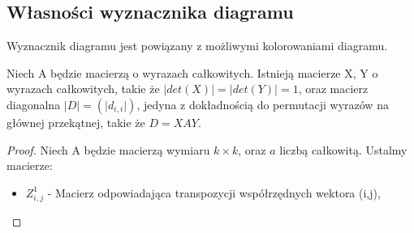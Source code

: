 \subsection{Własności wyznacznika diagramu}
Wyznacznik diagramu jest powiązany z możliwymi kolorowaniami diagramu.

\begin{lemat}
Niech A będzie macierzą o wyrazach całkowitych. Istnieją macierze X, Y o wyrazach całkowitych, takie że $\vert det(X) \vert= \vert det(Y) \vert=1$, oraz macierz diagonalna $\vert D \vert=(\vert d_{i,i} \vert)$, jedyna z dokładnością do permutacji wyrazów na głównej przekątnej, takie że $D=XAY$.
\end{lemat}
\begin{proof}
Niech A będzie macierzą wymiaru $k \times k$, oraz  $a$ liczbą całkowitą. Ustalmy macierze:
\begin{itemize}
\item $Z^1_{i,j}$  -  Macierz odpowiadająca transpozycji współrzędnych wektora (i,j),


\end{itemize}
\end{proof}
